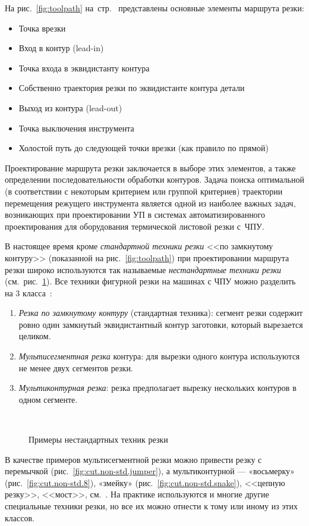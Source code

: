 На рис.~\ref{fig:toolpath}
на~стр.~\pageref{fig:toolpath}
представлены основные элементы маршрута резки:
\begin{itemize}
  \item Точка врезки
  \item Вход в контур (lead-in)
  \item Точка входа в эквидистанту контура
  \item Собственно траектория резки по эквидистанте контура детали
  \item Выход из контура (lead-out)
  \item Точка выключения инструмента
  \item Холостой путь до следующей точки врезки
  (как правило по прямой)
\end{itemize}

Проектирование маршрута резки заключается в выборе
этих элементов,
а также определении последовательности обработки контуров.
Задача поиска оптимальной
(в соответствии с некоторым критерием или группой критериев)
траектории перемещения режущего
инструмента является одной из наиболее
важных задач, возникающих при проектировании УП
в системах автоматизированного проектирования для
оборудования термической листовой резки
с~ЧПУ.

В настоящее время кроме \textit{стандартной техники резки}
<<по замкнутому контуру>>
(показанной на рис.~\ref{fig:toolpath})
при проектировании маршрута резки широко используются
так называемые
\textit{нестандартные техники резки}
(см.~рис.~\ref{fig:cut.non-std}).
Все техники фигурной резки на
машинах с ЧПУ можно разделить на 3 класса~\cite{bi:Petunin2015}:
\begin{enumerate}
  \item \textit{Резка по замкнутому контуру}
  (стандартная техника):
  сегмент резки содержит ровно один замкнутый эквидистантный контур
  заготовки, который вырезается целиком.
  \item \textit{Мультисегментная резка} контура:
  для вырезки одного
  контура используются не менее двух сегментов резки.
  \item \textit{Мультиконтурная резка}:
  резка предполагает вырезку нескольких контуров в одном сегменте.
\end{enumerate}

\begin{figure}
  \centering
  \\
  \caption{Примеры нестандартных техник резки}
  \label{fig:cut.non-std}
\end{figure}

В качестве примеров
мультисегментной
резки можно привести
резку с перемычкой
(рис.~\ref{fig:cut.non-std.jumper}),
а мультиконтурной ---
«восьмерку»
(рис.~\ref{fig:cut.non-std.8}),
«змейку»
(рис.~\ref{fig:cut.non-std.snake}),
<<цепную резку>>, <<мост>>,
см.~\cite{bi:book2020}.
На практике используются и многие другие специальные техники резки,
но все их можно отнести к тому или иному из этих классов.
